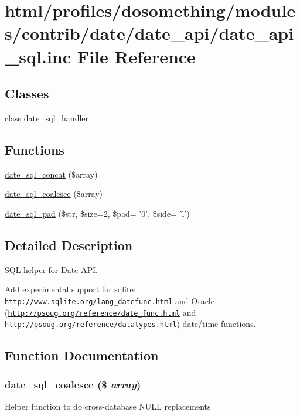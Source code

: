 \hypertarget{date__api__sql_8inc}{
\section{html/profiles/dosomething/modules/contrib/date/date\_\-api/date\_\-api\_\-sql.inc File Reference}
\label{date__api__sql_8inc}
}
\subsection*{Classes}
\begin{DoxyCompactItemize}
\item 
class \hyperlink{classdate__sql__handler}{date\_\-sql\_\-handler}
\end{DoxyCompactItemize}
\subsection*{Functions}
\begin{DoxyCompactItemize}
\item 
\hyperlink{date__api__sql_8inc_a86684528ccd56b5aadb186bde4978d9c}{date\_\-sql\_\-concat} (\$array)
\item 
\hyperlink{date__api__sql_8inc_af91d8e6e23cf15b28d3e8094bd40e48a}{date\_\-sql\_\-coalesce} (\$array)
\item 
\hyperlink{date__api__sql_8inc_aee417d7216dcd7d57a2eaeddc26fd1ae}{date\_\-sql\_\-pad} (\$str, \$size=2, \$pad= '0', \$side= 'l')
\end{DoxyCompactItemize}


\subsection{Detailed Description}
SQL helper for Date API.

Add experimental support for sqlite: \href{http://www.sqlite.org/lang_datefunc.html}{\tt http://www.sqlite.org/lang\_\-datefunc.html} and Oracle (\href{http://psoug.org/reference/date_func.html}{\tt http://psoug.org/reference/date\_\-func.html} and \href{http://psoug.org/reference/datatypes.html}{\tt http://psoug.org/reference/datatypes.html}) date/time functions. 

\subsection{Function Documentation}
\hypertarget{date__api__sql_8inc_af91d8e6e23cf15b28d3e8094bd40e48a}{
\subsubsection[{date\_\-sql\_\-coalesce}]{\setlength{\rightskip}{0pt plus 5cm}date\_\-sql\_\-coalesce (\$ {\em array})}}
\label{date__api__sql_8inc_af91d8e6e23cf15b28d3e8094bd40e48a}
Helper function to do cross-\/database NULL replacements


